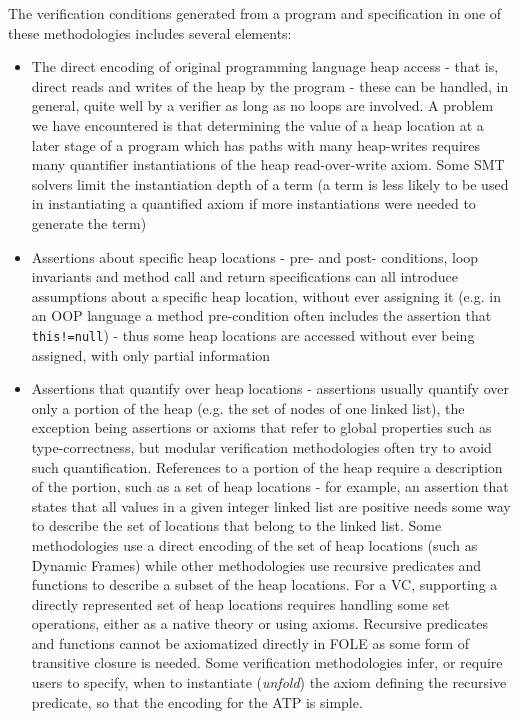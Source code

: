 	
	The verification conditions generated from a program and specification in one of these methodologies includes several elements:
	\begin{itemize}
		\item The direct encoding of original programming language heap access - that is, direct reads and writes of the heap by the program - these can be handled, in general, quite well by a verifier as long as no loops are involved. 
		A problem we have encountered is that determining the value of a heap location at a later stage of a program which has paths with many heap-writes requires many quantifier instantiations of the heap read-over-write axiom. Some SMT solvers limit the instantiation depth of a term (a term is less likely to be used in instantiating a quantified axiom if more instantiations were needed to generate the term)
		\item Assertions about specific heap locations - pre- and post- conditions, loop invariants and method call and return specifications can all introduce assumptions about a specific heap location, without ever assigning it (e.g. in an OOP language a method pre-condition often includes the assertion that \lstinline|this!=null|) - thus some heap locations are accessed without ever being assigned, with only partial information
		\item Assertions that quantify over heap locations - assertions usually quantify over only a portion of the heap (e.g. the set of nodes of one linked list), the exception being assertions or axioms that refer to global properties such as type-correctness, but modular verification methodologies often try to avoid such quantification. References to a portion of the heap require a description of the portion, such as a set of heap locations - for example, an assertion that states that all values in a given integer linked list are positive needs some way to describe the set of locations that belong to the linked list. Some methodologies use a direct encoding of the set of heap locations (such as Dynamic Frames) while other methodologies use recursive predicates and functions to describe a subset of the heap locations.
		For a VC, supporting a directly represented set of heap locations requires handling some set operations, either as a native theory or using axioms. 
		Recursive predicates and functions cannot be axiomatized directly in FOLE as some form of transitive closure is needed. Some verification methodologies infer, or require users to specify, when to instantiate (\emph{unfold}) the axiom defining the recursive predicate, so that the encoding for the ATP is simple. 

\end{itemize}
